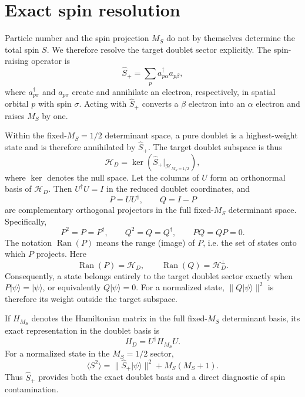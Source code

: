 \documentclass[
 aip,
 jcp,
 amsmath,amssymb,
 preprint
]{revtex4-2}
\begin{document}
\section{Exact spin resolution}

Particle number and the spin projection $M_S$ do not by themselves determine the total spin $S$.
We therefore resolve the target doublet sector explicitly.
The spin-raising operator is
\begin{equation}
\hat S_+=\sum_p a_{p\alpha}^\dagger a_{p\beta},
\end{equation}
where $a_{p\sigma}^\dagger$ and $a_{p\sigma}$ create and annihilate an electron, respectively, in spatial orbital $p$ with spin $\sigma$.
Acting with $\hat S_+$ converts a $\beta$ electron into an $\alpha$ electron and raises $M_S$ by one.

Within the fixed-$M_S=1/2$ determinant space, a pure doublet is a highest-weight state and is therefore annihilated by $\hat S_+$.
The target doublet subspace is thus
\begin{equation}
\mathcal H_D
=
\ker\!\left(\hat S_+\big|_{\mathcal H_{M_S=1/2}}\right),
\end{equation}
where $\ker$ denotes the null space.
Let the columns of $U$ form an orthonormal basis of $\mathcal H_D$.
Then $U^\dagger U=I$ in the reduced doublet coordinates, and
\begin{equation}
P=UU^\dagger,\qquad Q=I-P
\end{equation}
are complementary orthogonal projectors in the full fixed-$M_S$ determinant space.
Specifically,
\[
P^2=P=P^\dagger,\qquad
Q^2=Q=Q^\dagger,\qquad
PQ=QP=0.
\]
The notation $\operatorname{Ran}(P)$ means the range (image) of $P$, i.e. the set of states onto which $P$ projects.
Here
\[
\operatorname{Ran}(P)=\mathcal H_D,
\qquad
\operatorname{Ran}(Q)=\mathcal H_D^\perp.
\]
Consequently, a state belongs entirely to the target doublet sector exactly when $P|\psi\rangle=|\psi\rangle$, or equivalently $Q|\psi\rangle=0$.
For a normalized state, $\|Q|\psi\rangle\|^2$ is therefore its weight outside the target subspace.

If $H_{M_S}$ denotes the Hamiltonian matrix in the full fixed-$M_S$ determinant basis, its exact representation in the doublet basis is
\begin{equation}
H_D=U^\dagger H_{M_S}U .
\end{equation}
For a normalized state in the $M_S=1/2$ sector,
\begin{equation}
\langle S^2\rangle
=
\|\hat S_+|\psi\rangle\|^2+M_S(M_S+1).
\end{equation}
Thus $\hat S_+$ provides both the exact doublet basis and a direct diagnostic of spin contamination.
\end{document}
